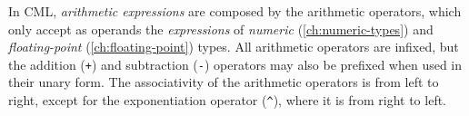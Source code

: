 In CML, \emph{arithmetic expressions} are composed by the arithmetic operators,
which only accept as operands
the \emph{expressions} of \emph{numeric} (\ref{ch:numeric-types})
and \emph{floating-point} (\ref{ch:floating-point}) types.
All arithmetic operators are infixed,
but the addition (\verb|+|) and subtraction (\verb|-|) operators may also be prefixed when used in their unary form.
The associativity of the arithmetic operators is from left to right,
except for the exponentiation operator (\verb|^|),
where it is from right to left.
